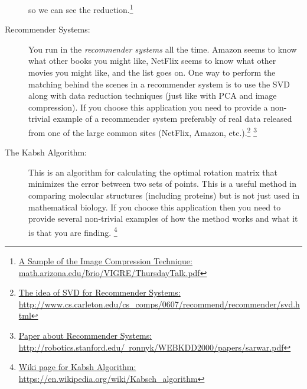 \begin{description}
        so we can see the
        reduction.\footnote{\href{http://math.arizona.edu/~brio/VIGRE/ThursdayTalk.pdf}{A
        Sample of the Image Compression Technique: math.arizona.edu/\~brio/VIGRE/ThursdayTalk.pdf}}
    \item[Recommender Systems:] You run in the {\it recommender systems} all the time.
        Amazon seems to know what other books you might like, NetFlix seems to know what
        other movies you might like, and the list goes on.  One way to perform the
        matching behind the scenes in a
        recommender system is to use the SVD along with data reduction techniques (just
        like with PCA and image compression).  If you choose this application you need to
        provide a non-trivial example of a recommender system preferably of real data
        released from one of the large common sites (NetFlix, Amazon,
        etc.).\footnote{\href{http://www.cs.carleton.edu/cs_comps/0607/recommend/recommender/svd.html}{The
            idea of SVD for Recommender Systems:
        http://www.cs.carleton.edu/cs\_comps/0607/recommend/recommender/svd.html}}
        \footnote{\href{http://robotics.stanford.edu/~ronnyk/WEBKDD2000/papers/sarwar.pdf}{Paper
            about Recommender Systems:
        http://robotics.stanford.edu/~ronnyk/WEBKDD2000/papers/sarwar.pdf}}
    \item[The Kabsh Algorithm:] This is an algorithm for calculating the optimal rotation
        matrix that minimizes the error between two sets of points.  This
        is a useful method in comparing molecular structures (including proteins) but is
        not just used in mathematical biology.  If you
        choose this application then you need to provide several non-trivial examples of
        how the method works and what it is that you are finding.
        \footnote{\href{https://en.wikipedia.org/wiki/Kabsch_algorithm}{Wiki page for
        Kabsh Algorithm: https://en.wikipedia.org/wiki/Kabsch\_algorithm} }

\end{description}
